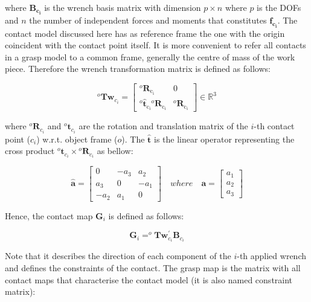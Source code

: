 \noindent
where $\mathbf{{B}_{c_i}}$ is the wrench basis matrix with dimension $p \times n$ where $p$ is the \acp{DOF} and $n$ the number of independent forces and moments that constitutes $\mathbf{{f}_{c_i}}$. The contact model discussed here has as reference frame the one with the origin coincident with the contact point itself. It is more convenient to refer all contacts in a grasp model to a common frame, generally the centre of mass of the work piece. Therefore the wrench transformation matrix is defined as follows:

\begin{equation}
^{o} \mathbf{Tw}_{c_i}=\left[\begin{array}{cc}
{^{o} \mathbf{R}_{\mathrm{c_i}}} & {0} \\
{^o \hat{\mathbf{t}}_{\mathrm{c_i}} {}^{o} \mathbf{R}_{\mathrm{c_i}}} & {^{o} \mathbf{R}_{\mathrm{c_i}}}
\end{array}\right]
\in \mathbb{R}^3
\end{equation}

\noindent
where $ ^o\mathbf{R}_{c_i}$ and $^o\mathbf{t}_{c_i}$ are the rotation and translation matrix of the $i$-th contact point ($c_i$) w.r.t. object frame ($o$). The $\mathbf{\hat{t}}$ is the linear operator representing the cross product $^o\mathbf{t}_{c_i} \times {{{}^o}\mathbf{R}}_{c_i}$ as bellow:

\begin{equation}
\widehat{\boldsymbol{a}}=\left[\begin{array}{ccc}
0 & -a_{3} & a_{2} \\
a_{3} & 0 & -a_{1} \\
-a_{2} & a_{1} & 0
\end{array}\right] \quad where \quad \boldsymbol{a} = \left[\begin{array}{c}
a_{1} \\
a_{2} \\
a_{3}
\end{array}\right]
\end{equation}


Hence, the contact map $\mathbf{G}_{i}$ is defined as follows:

\begin{equation}
\mathbf{G}_{i}=^{o} \mathbf{T} \mathbf{w}_{c_i}^{\prime} \mathbf{B}_{c_i}
\end{equation}

Note that it describes the direction of each component of the $i$-th applied wrench and defines the constraints of the contact. The grasp map is the matrix with all contact maps that characterise the contact model (it is also named constraint matrix):

